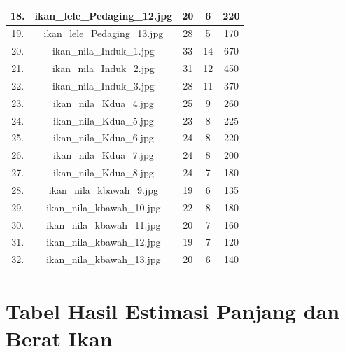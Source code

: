 \begin{longtable}{|c|c|c|c|c|}
        \hline
        18. & ikan\_lele\_Pedaging\_12.jpg & 20 & 6 & 220 \\
        \hline
        19. & ikan\_lele\_Pedaging\_13.jpg & 28 & 5 & 170 \\
        \hline
        20. & ikan\_nila\_Induk\_1.jpg & 33 & 14 & 670 \\
        \hline
        21. & ikan\_nila\_Induk\_2.jpg & 31 & 12 & 450 \\
        \hline
        22. & ikan\_nila\_Induk\_3.jpg & 28 & 11  &  370 \\
        \hline
        23. & ikan\_nila\_Kdua\_4.jpg & 25 & 9 & 260 \\
        \hline
        24. & ikan\_nila\_Kdua\_5.jpg & 23 & 8 & 225 \\
        \hline
        25. & ikan\_nila\_Kdua\_6.jpg & 24 & 8 & 220 \\
        \hline
        26. & ikan\_nila\_Kdua\_7.jpg & 24 & 8 & 200 \\
        \hline
        27. & ikan\_nila\_Kdua\_8.jpg & 24 & 7 & 180 \\
        \hline
        28. & ikan\_nila\_kbawah\_9.jpg & 19 & 6 & 135 \\
        \hline
        29. & ikan\_nila\_kbawah\_10.jpg & 22 & 8 & 180 \\
        \hline
        30. & ikan\_nila\_kbawah\_11.jpg & 20 & 7 & 160 \\
        \hline
        31. & ikan\_nila\_kbawah\_12.jpg & 19 & 7 & 120 \\
        \hline
        32. & ikan\_nila\_kbawah\_13.jpg & 20 & 6 & 140 \\
        \hline
\end{longtable}

\chapter{Tabel Hasil Estimasi Panjang dan Berat Ikan}

